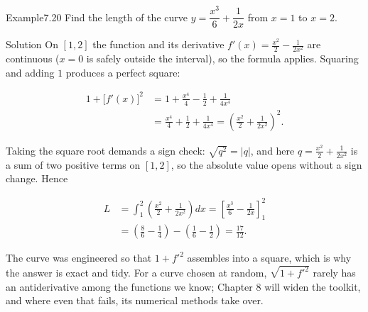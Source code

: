 \documentclass[a4paper,12pt,oneside]{memoir}
\begin{document}
\begin{workedexample}
\begin{envexample}{Example}{7.20}{}
Find the length of the curve \(y = \dfrac{x^{3}}{6} + \dfrac{1}{2x}\) from \(x = 1\) to \(x = 2\).
\end{envexample}
\begin{envsolution}{Solution}{}{}
On \([1, 2]\) the function and its derivative \(f'(x) = \tfrac{x^{2}}{2} - \tfrac{1}{2x^{2}}\) are continuous (\(x = 0\) is safely outside the interval), so the formula applies. Squaring and adding \(1\) produces a perfect square:

\[ \begin{aligned}
          1 + \bigl[f'(x)\bigr]^{2} &= 1 + \frac{x^{4}}{4} - \frac{1}{2} + \frac{1}{4x^{4}} \\[2pt]
            &= \frac{x^{4}}{4} + \frac{1}{2} + \frac{1}{4x^{4}} = \left(\frac{x^{2}}{2} + \frac{1}{2x^{2}}\right)^{2}.
        \end{aligned} \]

Taking the square root demands a sign check: \(\sqrt{q^{2}} = \lvert q\rvert\), and here \(q = \tfrac{x^{2}}{2} + \tfrac{1}{2x^{2}}\) is a sum of two positive terms on \([1, 2]\), so the absolute value opens without a sign change. Hence

\[ \begin{aligned}
          L &= \int_{1}^{2} \left(\frac{x^{2}}{2} + \frac{1}{2x^{2}}\right) dx = \left[\frac{x^{3}}{6} - \frac{1}{2x}\right]_{1}^{2} \\[2pt]
            &= \left(\frac{8}{6} - \frac{1}{4}\right) - \left(\frac{1}{6} - \frac{1}{2}\right) = \frac{17}{12}.
        \end{aligned} \]

The curve was engineered so that \(1 + f'^{2}\) assembles into a square, which is why the answer is exact and tidy. For a curve chosen at random, \(\sqrt{1 + f'^{2}}\) rarely has an antiderivative among the functions we know; Chapter 8 will widen the toolkit, and where even that fails, its numerical methods take over. \qedmark
\end{envsolution}
\end{workedexample}
\end{document}
